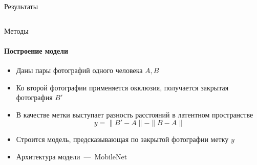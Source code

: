 \documentclass{beamer}
\begin{document}
\begin{frame}{Результаты}
\begin{columns}
\begin{column}{0.5\textwidth}
\begin{table}[h!]
\centering
{}
\end{table}
\end{column}

\end{columns}

\end{frame}


\begin{frame}{Методы}
\framesubtitle{Построение модели}
\begin{itemize}
    \item Даны пары фотографий одного человека $A, B$
    \item Ко второй фотографии применяется окклюзия, получается закрытая фотография $B'$
    \item В качестве метки выступает разность расстояний в латентном пространстве
    $$y = \|B' - A\| - \|B - A\|$$
    \item Строится модель, предсказывающая по закрытой фотографии метку $y$
    \item Архитектура модели~---~MobileNet
\end{itemize}
\end{frame}
\end{document}
